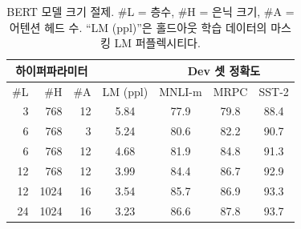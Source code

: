 \begin{table}[b]
\begin{center}
{\small
\begin{tabular}{@{}rrrcccc@{}}
  \toprule
  \multicolumn{3}{c}{하이퍼파라미터}      &      & \multicolumn{3}{c}{Dev 셋 정확도} \\
  \midrule
  \#L & \#H &\#A & LM (ppl) & MNLI-m & MRPC &SST-2               \\
  \midrule
  \
   3 &  768 & 12 & 5.84 & 77.9 & 79.8 & 88.4 \\
   6 &  768 &  3 & 5.24 & 80.6 & 82.2 & 90.7 \\
   6 &  768 & 12 & 4.68 & 81.9 & 84.8 & 91.3 \\
  12 &  768 & 12 & 3.99 & 84.4 & 86.7 & 92.9 \\
  12 & 1024 & 16 & 3.54 & 85.7 & 86.9 & 93.3 \\
  24 & 1024 & 16 & 3.23 & 86.6 & 87.8 & 93.7 \\
\bottomrule
\end{tabular}
} %
\end{center}
\caption{\label{tab:size_ablation} BERT 모델 크기 절제. \#L = 층수, \#H = 은닉 크기, \#A = 어텐션 헤드 수. ``LM (ppl)''은 홀드아웃 학습 데이터의 마스킹 LM 퍼플렉시티다.}
\end{table}
